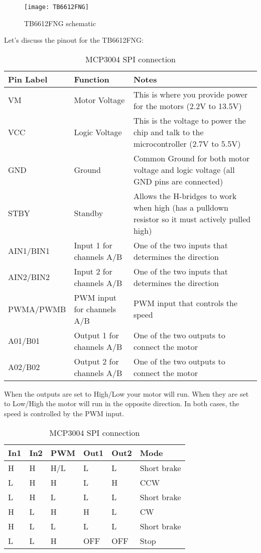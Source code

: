 \documentclass[
12pt, %
a4paper, %
oneside, %
headinclude,footinclude, %
BCOR5mm, %
]{scrartcl}
\begin{document}
\begin{figure}[!htb]
\centering
\texttt{[image: TB6612FNG]} 
\caption[TB6612FNG schematic]{TB6612FNG schematic}
\label{fig:TB6612FNG}
\end{figure}
Let’s discuss the pinout for the TB6612FNG:


\newcolumntype{b}{X}

\begin{table}[hbt]
\begin{adjustwidth}{-3cm}{}
\caption{MCP3004 SPI connection}
\centering
\begin{tabularx}{18cm}{ssb}
\toprule
Pin Label & Function & Notes \\
\midrule
VM & Motor Voltage  & This is where you provide power for the motors (2.2V to 13.5V)\\
VCC & Logic Voltage & This is the voltage to power the chip and talk to the microcontroller (2.7V to 5.5V)\\
GND & Ground  & Common Ground for both motor voltage and logic voltage (all GND pins are connected)\\
STBY & Standby & Allows the H-bridges to work when high (has a pulldown resistor so it must actively pulled high)\\
AIN1/BIN1 & Input 1 for channels A/B   & One of the two inputs that determines the direction\\
AIN2/BIN2 & Input 2 for channels A/B   & One of the two inputs that determines the direction\\
PWMA/PWMB & PWM input for channels A/B & PWM input that controls the speed\\
A01/B01 & Output 1 for channels A/B  & One of the two outputs to connect the motor\\
A02/B02 & Output 2 for channels A/B  & One of the two outputs to connect the motor\\
\bottomrule
\end{tabularx}
\label{tab:label}
\end{adjustwidth}
\end{table}

When the outputs are set to High/Low your motor will run. When they are set to Low/High the motor will run in the opposite direction. In both cases, the speed is controlled by the PWM input.

\begin{table}[hbt]
\caption{MCP3004 SPI connection}
\centering
\begin{tabular}{llllll}
\toprule
In1  & In2 & PWM & Out1 & Out2 & Mode \\
\midrule
H    & H   & H/L & L    &L     & Short brake\\
L    & H   & H   & L    & H    & CCW\\
L    & H   & L   & L    & L    & Short brake\\
H    & L   & H   & H    & L    & CW\\
H    & L   & L   & L    & L    & Short brake\\
L    & L   & H   & OFF  & OFF  & Stop\\
\bottomrule
\end{tabular}
\label{tab:label}
\end{table}
\end{document}
